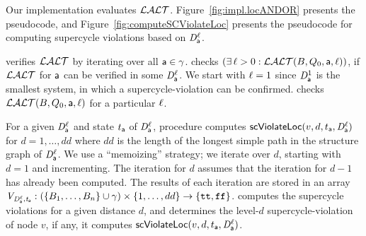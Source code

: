 Our implementation evaluates $\mathcal{LALT}$.
Figure~\ref{fig:impl.locANDOR}  presents the pseudocode, and 
Figure~\ref{fig:computeSCViolateLoc} presents the pseudocode for
computing supercycle violations based on $\mathit{D}_{\mathsf{a}}^{\ell}$.

 verifies $\mathcal{LALT}$ by iterating over all $\mathsf{a} \in \gamma$. 
 checks $(\exists\, \ell > 0: \mathcal{LALT}(B, Q_0, \mathsf{a}, \ell))$, \ie if $\mathcal{LALT}$ for $\mathsf{a}$ can be verified
in some  $\mathit{D}_{\mathsf{a}}^{\ell}$. We start with $\ell=1$ since $\mathit{D}_{\mathsf{a}}^{1}$ is the smallest system, in which a
supercycle-violation can be confirmed. 
 checks $\mathcal{LALT}(B, Q_0, \mathsf{a}, \ell)$ for a particular $\ell$. 

For a given $\mathit{D}_{\mathsf{a}}^{\ell}$ and state $t_{\mathsf{a}}$ of $\mathit{D}_{\mathsf{a}}^{\ell}$, procedure  computes
$\mathsf{scViolateLoc}(v,d,t_{\mathsf{a}},\mathit{D}_{\mathsf{a}}^{\ell})$ for $d = 1,\ldots,dd$ where $dd$ is
the length of the longest simple path in the structure graph of $\mathit{D}_{\mathsf{a}}^{\ell}$.
We use a ``memoizing'' strategy; we iterate over $d$, starting with $d=1$ and incrementing.  The iteration for $d$ assumes that
the iteration for $d-1$ has already been computed.  The results of each iteration are stored in an array
$\mathit{V_{\mathit{D}_{\mathsf{a}}^{\ell},t_{\mathsf{a}}}}: (\{ B_1,\ldots,B_n \} \cup \gamma) \times \{ 1,\ldots,dd \} \to \{ \textup{\texttt{tt}},\textup{\texttt{ff}} \}$.
%
%
 computes the supercycle violations for a given distance $d$, and
 determines the level-$d$ supercycle-violation of node $v$, if any, \ie it computes 
$\mathsf{scViolateLoc}(v,d,t_{\mathsf{a}},\mathit{D}_{\mathsf{a}}^{\ell})$.





